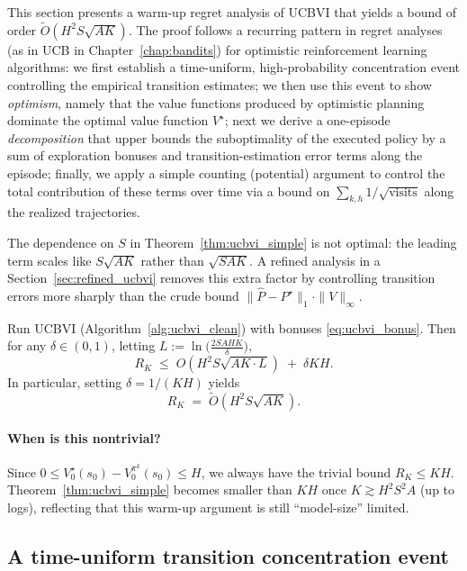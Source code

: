 This section presents a warm-up regret analysis of UCBVI that yields a bound of order
$\widetilde O(H^2 S\sqrt{AK})$. The proof follows a recurring pattern in regret analyses (as in UCB in Chapter~\ref{chap:bandits}) for
optimistic reinforcement learning algorithms: we first establish a time-uniform, high-probability
concentration event controlling the empirical transition estimates; we then use this event to show
\emph{optimism}, namely that the value functions produced by optimistic planning dominate the optimal
value function $V^\star$; next we derive a one-episode \emph{decomposition} that upper bounds the
suboptimality of the executed policy by a sum of exploration bonuses and transition-estimation error
terms along the episode; finally, we apply a simple counting (potential) argument to control the
total contribution of these terms over time via a bound on
$\sum_{k,h} 1/\sqrt{\text{visits}}$ along the realized trajectories.

The dependence on $S$ in Theorem~\ref{thm:ucbvi_simple} is not optimal: the leading term scales like
$S\sqrt{AK}$ rather than $\sqrt{SAK}$. A refined analysis in a Section~\ref{sec:refined_ucbvi} removes this extra factor
by controlling transition errors more sharply than the crude bound
$\|\widehat P-P^\star\|_1\cdot \|V\|_\infty$.

\begin{theorem}
\label{thm:ucbvi_simple}
Run UCBVI (Algorithm~\ref{alg:ucbvi_clean}) with bonuses \eqref{eq:ucbvi_bonus}.
Then for any $\delta\in(0,1)$, letting $L:=\ln\!\big(\tfrac{2SAHK}{\delta}\big)$,
\[
R_K
\;\le\;
O\!\left(H^2 S\sqrt{AK\cdot L}\right)
\;+\;
\delta K H.
\]
In particular, setting $\delta = 1/(KH)$ yields
\[
R_K
\;=\;
\widetilde O\!\left(H^2 S\sqrt{AK}\right).
\]
\end{theorem}

\paragraph{When is this nontrivial?}
Since $0\le V_0^\star(s_0)-V_0^{\pi^k}(s_0)\le H$, we always have the trivial bound $R_K\le KH$.
Theorem~\ref{thm:ucbvi_simple} becomes smaller than $KH$ once $K\gtrsim H^2 S^2 A$ (up to logs),
reflecting that this warm-up argument is still ``model-size'' limited.


\subsection{A time-uniform transition concentration event}


